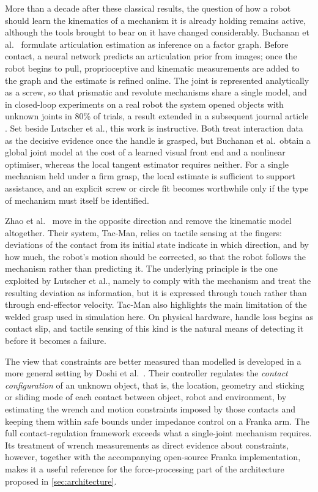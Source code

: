 \documentclass[11pt,letterpaper]{article}
\begin{document}
More than a decade after these classical results, the question of how a robot should learn the kinematics of a mechanism it is already holding remains active, although the tools brought to bear on it have changed considerably. Buchanan et al.\ \cite{buchanan2024online} formulate articulation estimation as inference on a factor graph. Before contact, a neural network predicts an articulation prior from images; once the robot begins to pull, proprioceptive and kinematic measurements are added to the graph and the estimate is refined online. The joint is represented analytically as a screw, so that prismatic and revolute mechanisms share a single model, and in closed-loop experiments on a real robot the system opened objects with unknown joints in 80\% of trials, a result extended in a subsequent journal article \cite{buchanan2025online}. Set beside Lutscher et al., this work is instructive. Both treat interaction data as the decisive evidence once the handle is grasped, but Buchanan et al.\ obtain a global joint model at the cost of a learned visual front end and a nonlinear optimiser, whereas the local tangent estimator requires neither. For a single mechanism held under a firm grasp, the local estimate is sufficient to support assistance, and an explicit screw or circle fit becomes worthwhile only if the type of mechanism must itself be identified.

Zhao et al.\ \cite{zhao2025tacman} move in the opposite direction and remove the kinematic model altogether. Their system, Tac-Man, relies on tactile sensing at the fingers: deviations of the contact from its initial state indicate in which direction, and by how much, the robot's motion should be corrected, so that the robot follows the mechanism rather than predicting it. The underlying principle is the one exploited by Lutscher et al., namely to comply with the mechanism and treat the resulting deviation as information, but it is expressed through touch rather than through end-effector velocity. Tac-Man also highlights the main limitation of the welded grasp used in simulation here. On physical hardware, handle loss begins as contact slip, and tactile sensing of this kind is the natural means of detecting it before it becomes a failure.

The view that constraints are better measured than modelled is developed in a more general setting by Doshi et al.\ \cite{doshi2022manipulation}. Their controller regulates the \emph{contact configuration} of an unknown object, that is, the location, geometry and sticking or sliding mode of each contact between object, robot and environment, by estimating the wrench and motion constraints imposed by those contacts and keeping them within safe bounds under impedance control on a Franka arm. The full contact-regulation framework exceeds what a single-joint mechanism requires. Its treatment of wrench measurements as direct evidence about constraints, however, together with the accompanying open-source Franka implementation, makes it a useful reference for the force-processing part of the architecture proposed in \cref{sec:architecture}.
\end{document}
